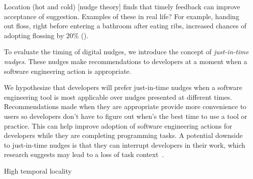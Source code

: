 Location (hot and cold) [nudge theory] finds that timely feedback can improve acceptance of suggestion. Examples of these in real life? For example, handing out floss, right before entering a bathroom after eating ribs, increased chances of adopting flossing by 20\% ().

To evaluate the timing of digital nudges, we introduce the concept of \emph{just-in-time nudges}. These nudges make recommendations to developers at a moment when a software engineering action is appropriate.

We hypothesize that developers will prefer just-in-time nudges when a software engineering tool is most applicable over nudges presented at different times. Recommendations made when they are appropriate provide more convenience to users so developers don't have to figure out when's the best time to use a tool or practice. This can help improve adoption of software engineering actions for developers while they are completing programming tasks. A potential downside to just-in-time nudges is that they can interrupt developers in their work, which research suggests may lead to a loss of task context~\cite{parnin2010interrupted}.

High temporal locality






